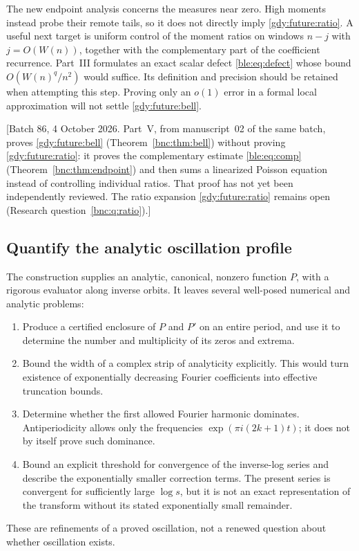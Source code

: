\documentclass[11pt]{article}
\numberwithin{equation}{section}
\theoremstyle{definition}
\theoremstyle{remark}
\begin{document}
The new endpoint analysis concerns the measures near zero. High
moments instead probe their remote tails, so it does not directly
imply \eqref{gdy:future:ratio}. A useful next target is uniform control of
the moment ratios on windows $n-j$ with $j=O(W(n))$, together with
the complementary part of the coefficient recurrence. Part~III
formulates an exact scalar defect \eqref{ble:eq:defect} whose bound
$O(W(n)^q/n^2)$ would suffice. Its definition and precision should
be retained when attempting this step. Proving only an $o(1)$ error
in a formal local approximation will not settle
\eqref{gdy:future:bell}.

[Batch 86, 4 October 2026. Part~V, from manuscript~02 of the same batch,
proves \eqref{gdy:future:bell} (Theorem~\ref{bnc:thm:bell}) without
proving \eqref{gdy:future:ratio}: it proves the complementary estimate
\eqref{ble:eq:comp} (Theorem~\ref{bnc:thm:endpoint}) and then sums a
linearized Poisson equation instead of controlling individual ratios.
That proof has not yet been independently reviewed. The ratio expansion
\eqref{gdy:future:ratio} remains open (Research
question~\ref{bnc:q:ratio}).]

\subsection{Quantify the analytic oscillation profile}

The construction supplies an analytic, canonical, nonzero function
$P$, with a rigorous evaluator along inverse orbits. It leaves several
well-posed numerical and analytic problems:
\begin{enumerate}
\item Produce a certified enclosure of $P$ and $P'$ on an entire
period, and use it to determine the number and multiplicity of its
zeros and extrema.
\item Bound the width of a complex strip of analyticity explicitly.
This would turn existence of exponentially decreasing Fourier
coefficients into effective truncation bounds.
\item Determine whether the first allowed Fourier harmonic dominates.
Antiperiodicity allows only the frequencies
$\exp(\pi i(2k+1)t)$; it does not by itself prove such dominance.
\item Bound an explicit threshold for convergence of the inverse-log
series and describe the exponentially smaller correction terms.
The present series is convergent for sufficiently large $\log s$,
but it is not an exact representation of the transform without its
stated exponentially small remainder.
\end{enumerate}
These are refinements of a proved oscillation, not a renewed question
about whether oscillation exists.
\end{document}
